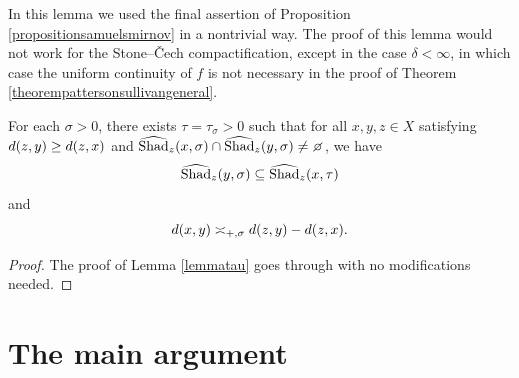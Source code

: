 \begin{remark}
\label{remarksamuelsmirnov}
In this lemma we used the final assertion of Proposition \ref{propositionsamuelsmirnov} in a nontrivial way. The proof of this lemma would not work for the Stone--\v Cech compactification, except in the case $\delta < \infty$, in which case the uniform continuity of $f$ is not necessary in the proof of Theorem \ref{theorempattersonsullivangeneral}.
\end{remark}

\begin{lemma}
\label{lemmataunonstandard}
For each $\sigma > 0$, there exists $\tau = \tau_\sigma > 0$ such that for all $x,y,z\in X$ satisfying $d(z,y)\geq d(z,x)$ and $\what\Shad_z(x,\sigma)\cap \what\Shad_z(y,\sigma)\neq\emptyset$, we have
\begin{equation}
\label{shadcontainmentnonstandard}
\widehat{\operatorname{Shad}}_z(y,\sigma) \subseteq \widehat{\operatorname{Shad}}_z(x,\tau)
\end{equation}
and
\begin{equation}
\label{distbusemannnonstandard}
d(x,y) \asymp_{+,\sigma} d(z,y) - d(z,x).
\end{equation}
\end{lemma}
\begin{proof}
The proof of Lemma \ref{lemmatau} goes through with no modifications needed.
\end{proof}

\section{The main argument}

